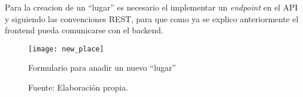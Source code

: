 Para la creacion de un ``lugar'' es necesario el implementar un \emph{endpoint} en el API y siguiendo las convenciones REST, para que como ya se explico anteriormente el frontend pueda comunicarse con el backend. \\


\begin{figure}[H]
      \begin{center}
        \texttt{[image: new\_place]}

        \caption{ Formulario para anadir un nuevo ``lugar''}
        \label{fig:new_place}
        \caption*{Fuente: Elaboración propia.}
      \end{center}
\end{figure}
